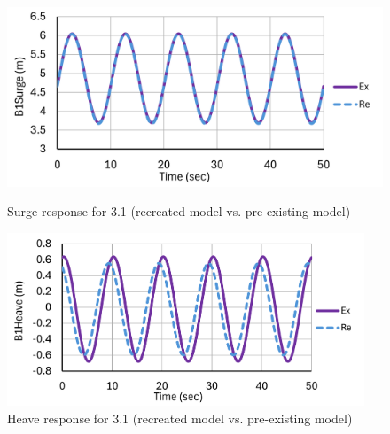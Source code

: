 \documentclass[a4paper, 11pt]{article}
\begin{document}
\begin{figure}[H]
    \begin{minipage}{0.48\textwidth}
        \centering
        \includegraphics[width=1\textwidth]{3.1_surge_mine.png}
        \caption{\small Surge response for 3.1 (recreated model vs. pre-existing model)}
        \label{fig:3.1_surge_mine_recreated}
    \end{minipage}
    \hfill
    \begin{minipage}{0.5\textwidth}
        \centering
        \includegraphics[width=0.95\textwidth]{3.1_heave_mine.png}
        \caption{\small Heave response for 3.1 (recreated model vs. pre-existing model)}
        \label{fig:3.1_heave_mine_recreated}
    \end{minipage}
\end{figure}
\end{document}
